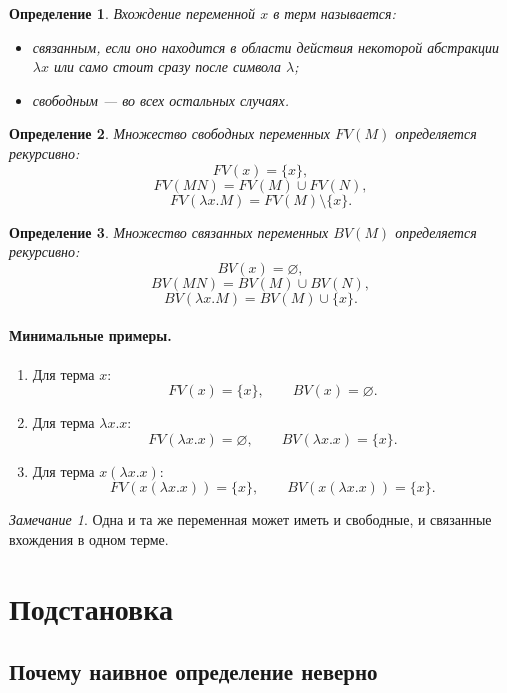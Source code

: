 \documentclass[12pt,a4paper]{article}
\newtheorem{definition}{Определение}
\theoremstyle{remark}
\newtheorem*{remark}{Замечание}
\begin{document}
\begin{definition}
Вхождение переменной $x$ в терм называется:
\begin{itemize}
    \item \emph{связанным}, если оно находится в области действия некоторой абстракции $\lambda x$ или само стоит сразу после символа $\lambda$;
    \item \emph{свободным} --- во всех остальных случаях.
\end{itemize}
\end{definition}

\begin{definition}
Множество свободных переменных $FV(M)$ определяется рекурсивно:
\[
FV(x)=\{x\},
\]
\[
FV(MN)=FV(M)\cup FV(N),
\]
\[
FV(\lambda x.M)=FV(M)\setminus\{x\}.
\]
\end{definition}

\begin{definition}
Множество связанных переменных $BV(M)$ определяется рекурсивно:
\[
BV(x)=\varnothing,
\]
\[
BV(MN)=BV(M)\cup BV(N),
\]
\[
BV(\lambda x.M)=BV(M)\cup\{x\}.
\]
\end{definition}

\paragraph{Минимальные примеры.}
\begin{enumerate}
    \item Для терма $x$:
    \[
    FV(x)=\{x\},\qquad BV(x)=\varnothing.
    \]
    \item Для терма $\lambda x.x$:
    \[
    FV(\lambda x.x)=\varnothing,\qquad BV(\lambda x.x)=\{x\}.
    \]
    \item Для терма $x(\lambda x.x)$:
    \[
    FV(x(\lambda x.x))=\{x\},\qquad BV(x(\lambda x.x))=\{x\}.
    \]
\end{enumerate}

\begin{remark}
Одна и та же переменная может иметь и свободные, и связанные вхождения в одном терме.
\end{remark}

\section{Подстановка}

\subsection{Почему наивное определение неверно}
\end{document}
